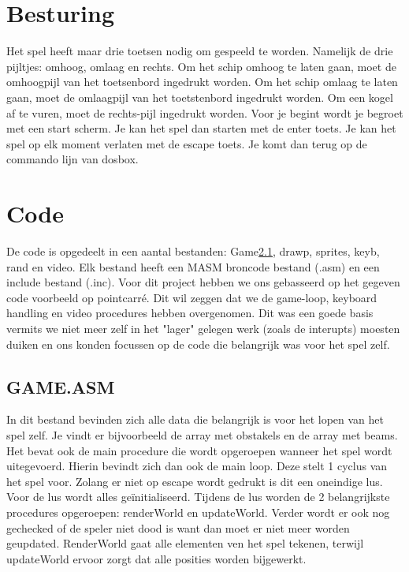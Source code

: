 \documentclass{article}
\begin{document}
\section{Besturing}

Het spel heeft maar drie toetsen nodig om gespeeld te worden. Namelijk de drie pijltjes: omhoog, omlaag en rechts.
Om het schip omhoog te laten gaan, moet de omhoogpijl van het toetsenbord ingedrukt worden.
Om het schip omlaag te laten gaan, moet de omlaagpijl van het toetstenbord ingedrukt worden.
Om een kogel af te vuren, moet de rechts-pijl ingedrukt worden.
Voor je begint wordt je begroet met een start scherm. Je kan het spel dan starten met de enter toets. 
Je kan het spel op elk moment verlaten met de escape toets. Je komt dan terug op de commando lijn van dosbox.

\section{Code}
De code is opgedeelt in een aantal bestanden: Game\ref{game_asm}, drawp, sprites, keyb, rand en video. Elk bestand heeft een MASM broncode bestand (.asm) en een include bestand (.inc).
Voor dit project hebben we ons gebasseerd op het gegeven code voorbeeld op pointcarré. Dit wil zeggen dat we de game-loop, keyboard handling en video procedures hebben overgenomen. 
Dit was een goede basis vermits we niet meer zelf in het "lager" gelegen werk (zoals de interupts) moesten duiken en ons konden focussen op de code die belangrijk was voor het spel zelf.

\subsection{GAME.ASM}\label{game_asm}
In dit bestand bevinden zich alle data die belangrijk is voor het lopen van het spel zelf. Je vindt er bijvoorbeeld de array met obstakels en de array met beams.
Het bevat ook de main procedure die wordt opgeroepen wanneer het spel wordt uitegevoerd. Hierin bevindt zich dan ook de main loop. Deze stelt 1 cyclus van het spel voor.
Zolang er niet op escape wordt gedrukt is dit een oneindige lus. Voor de lus wordt alles geïnitialiseerd. Tijdens de lus worden de 2 belangrijkste procedures opgeroepen: renderWorld en updateWorld. 
Verder wordt er ook nog gechecked of de speler niet dood is want dan moet er niet meer worden geupdated.
RenderWorld gaat alle elementen ven het spel tekenen, terwijl updateWorld ervoor zorgt dat alle posities worden bijgewerkt. 
\end{document}
